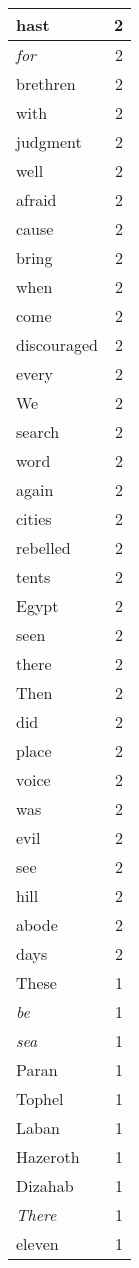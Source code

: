 \begin{center}
\begin{longtable}{l|r}
hast & 2 \\ \hline
\emph{for} & 2 \\ \hline
brethren & 2 \\ \hline
with & 2 \\ \hline
judgment & 2 \\ \hline
well & 2 \\ \hline
afraid & 2 \\ \hline
cause & 2 \\ \hline
bring & 2 \\ \hline
when & 2 \\ \hline
come & 2 \\ \hline
discouraged & 2 \\ \hline
every & 2 \\ \hline
We & 2 \\ \hline
search & 2 \\ \hline
word & 2 \\ \hline
again & 2 \\ \hline
cities & 2 \\ \hline
rebelled & 2 \\ \hline
tents & 2 \\ \hline
Egypt & 2 \\ \hline
seen & 2 \\ \hline
there & 2 \\ \hline
Then & 2 \\ \hline
did & 2 \\ \hline
place & 2 \\ \hline
voice & 2 \\ \hline
was & 2 \\ \hline
evil & 2 \\ \hline
see & 2 \\ \hline
hill & 2 \\ \hline
abode & 2 \\ \hline
days & 2 \\ \hline
These & 1 \\ \hline
\emph{be} & 1 \\ \hline
\emph{sea} & 1 \\ \hline
Paran & 1 \\ \hline
Tophel & 1 \\ \hline
Laban & 1 \\ \hline
Hazeroth & 1 \\ \hline
Dizahab & 1 \\ \hline
\emph{There} & 1 \\ \hline
eleven & 1 \\ \hline

\end{longtable}
\end{center}
